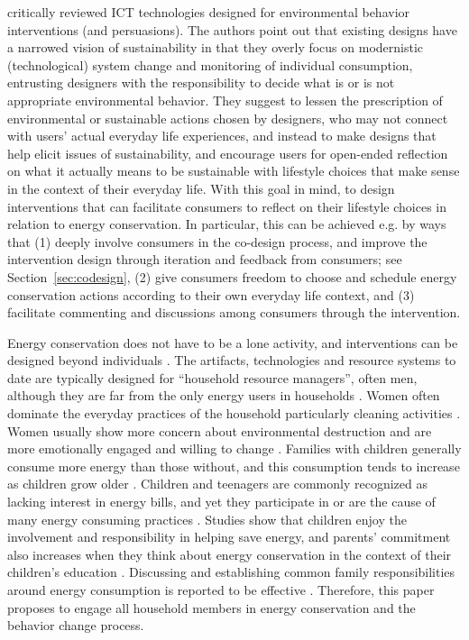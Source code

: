 \documentclass[a4paper]{article}
\begin{document}
\citet{Brynjarsdottir2012} critically reviewed ICT technologies designed for environmental behavior interventions (and persuasions). The authors point out that existing designs have a narrowed vision of sustainability in that they overly focus on modernistic (technological) system change and monitoring of individual consumption, entrusting designers with the responsibility to decide what is or is not appropriate environmental behavior. They suggest to lessen the prescription of environmental or sustainable actions chosen by designers, who may not connect with users' actual everyday life experiences, and instead to make designs that help elicit issues of sustainability, and encourage users for open-ended reflection on what it actually means to be sustainable with lifestyle choices that make sense in the context of their everyday life. With this goal in mind, to design interventions that can facilitate consumers to reflect on their lifestyle choices in relation to energy conservation. In particular, this can be achieved e.g. by ways that (1) deeply involve consumers in the co-design process, and improve the intervention design through iteration and feedback from consumers; see Section~\ref{sec:codesign}, (2) give consumers freedom to choose and schedule energy conservation actions according to their own everyday life context, and (3) facilitate commenting and discussions among consumers through the intervention.

Energy conservation does not have to be a lone activity, and interventions can be designed beyond individuals \citep{Petkov2011,Brynjarsdottir2012}. The artifacts, technologies and resource systems to date are typically designed for ``household resource managers'', often men, although they are far from the only energy users in households \citep{Strengers2014}. Women often dominate the everyday practices of the household particularly cleaning activities \citep{Strengers2011}. Women usually show more concern about environmental destruction and are more emotionally engaged and willing to change \citep{Kollmuss2002}. Families with children generally consume more energy than those without, and this consumption tends to increase as children grow older \citep{Fell2014}. Children and teenagers are commonly recognized as lacking interest in energy bills, and yet they participate in or are the cause of many energy consuming practices \citep{Berthou2013,Strengers2014}. Studies show that children enjoy the involvement and responsibility in helping save energy, and parents' commitment also increases when they think about energy conservation in the context of their children's education \citep{Burchell2014,Fell2014}. Discussing and establishing common family responsibilities around energy consumption is reported to be effective \citep{huizenga2015shedding}. Therefore, this paper proposes to engage all household members in energy conservation and the behavior change process. 
\end{document}

